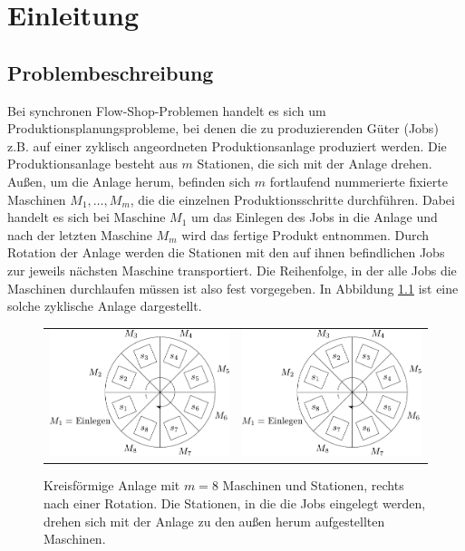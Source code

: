 \documentclass{scrreprt}
\begin{document}
\tableofcontents

\chapter{Einleitung}
\section{Problembeschreibung}
\label{sec:Problembeschreibung}
Bei synchronen Flow-Shop-Problemen handelt es sich um Produktions\-planungs\-probleme,
bei denen die zu produzierenden Güter (Jobs) z.B. auf einer zyklisch angeordneten Produktionsanlage
produziert werden. Die Produktionsanlage be\-steht aus $m$ Stationen, die sich mit der Anlage drehen.
Außen, um die Anlage herum, befinden sich $m$ fortlaufend nummerierte fixierte Maschinen $M_1,\ldots,M_m$, die die einzelnen Produktionsschritte durchführen.
Dabei handelt es sich bei Maschine $M_1$ um das Einlegen des Jobs in die Anlage und nach der letzten Maschine $M_m$ wird das fertige Produkt entnommen.
Durch Rotation der Anlage werden die Stationen mit den auf ihnen befindlichen Jobs zur jeweils nächsten Maschine transportiert.
Die Reihenfolge, in der alle Jobs die Maschinen durchlaufen müssen ist also fest vorgegeben.
In Abbildung \ref{abb:Anlage} ist eine solche zyklische Anlage dargestellt.
\begin{figure}[h]
    \begin{center}
        \begin{tabular}{cc}
            \includegraphics[width=.45\textwidth]{graphics/anlage.pdf}
            & \includegraphics[width=.45\textwidth]{graphics/anlage2.pdf}
        \end{tabular}
    \end{center}
    \caption{
        \label{abb:Anlage}
        Kreisförmige Anlage mit $m=8$ Maschinen und Stationen, rechts nach einer Rotation. 
        Die Stationen, in die die Jobs eingelegt werden, drehen sich mit der Anlage zu den außen herum aufgestellten Maschinen.
    }
\end{figure}
\end{document}
